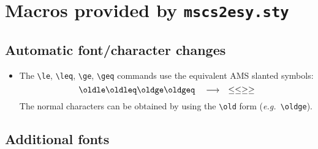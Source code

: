 \documentclass{mscs}
\newcommand\eg{\textit{e.g.\ }}
\begin{document}
\ifprodtf
%
\newcommand\lra{\quad\longrightarrow\quad}

\section{Macros provided by {\tt mscs2esy.sty}}

\subsection{Automatic font/character changes}

\begin{itemize}\itemsep=6pt
\item The \verb|\le|, \verb|\leq|, \verb|\ge|, \verb|\geq| commands
use the equivalent AMS slanted symbols:
\[
\oldle \oldleq \oldge \oldgeq
 \lra
\le \leq \ge \geq
\]
The normal characters can be obtained by using the \verb|\old| form
(\eg \verb|\oldge|).
\end{itemize}

\subsection{Additional fonts}
\end{document}
